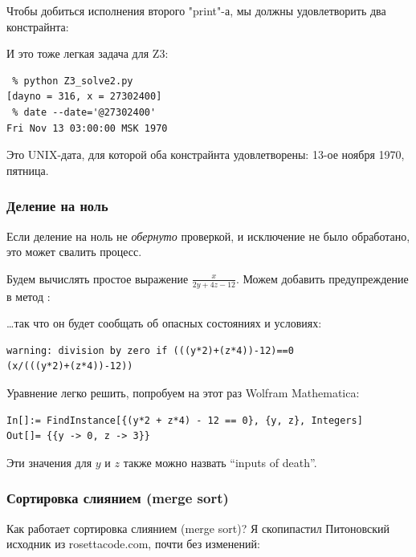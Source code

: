 Чтобы добиться исполнения второго "print"-а, мы должны удовлетворить два констрайнта:



И это тоже легкая задача для Z3:

\begin{lstlisting}
 % python Z3_solve2.py
[dayno = 316, x = 27302400]
 % date --date='@27302400'
Fri Nov 13 03:00:00 MSK 1970
\end{lstlisting}

Это UNIX-дата, для которой оба констрайнта удовлетворены: 13-ое ноября 1970, пятница.

\subsubsection{Деление на ноль}

Если деление на ноль не \textit{обернуто} проверкой, и исключение не было обработано, это может свалить процесс.

Будем вычислять простое выражение $\frac{x}{2y + 4z - 12}$.
Можем добавить предупреждение в метод :



\dots так что он будет сообщать об опасных состояниях и условиях:

\begin{lstlisting}
warning: division by zero if (((y*2)+(z*4))-12)==0
(x/(((y*2)+(z*4))-12))
\end{lstlisting}

Уравнение легко решить, попробуем на этот раз Wolfram Mathematica:

\begin{lstlisting}
In[]:= FindInstance[{(y*2 + z*4) - 12 == 0}, {y, z}, Integers]
Out[]= {{y -> 0, z -> 3}}
\end{lstlisting}

Эти значения для $y$ и $z$ также можно назвать ``inputs of death''.

\subsubsection{Сортировка слиянием (merge sort)}

Как работает сортировка слиянием (merge sort)?
Я скопипастил Питоновский исходник из rosettacode.com, почти без изменений:



